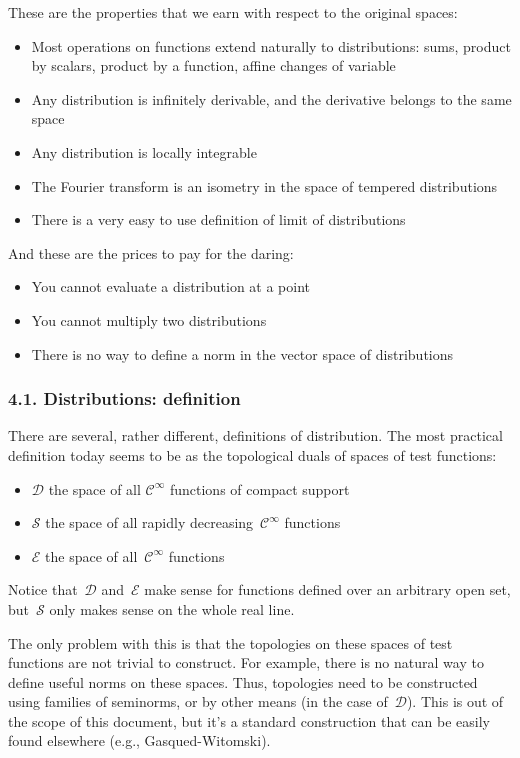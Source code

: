 These are the properties that we earn with respect to the original
spaces:
\begin{itemize}
	\item Most operations on functions extend naturally to
		distributions: sums, product by scalars, product by a function,
		affine changes of variable
	\item Any distribution is infinitely derivable, and the derivative
		belongs to the same space
	\item Any distribution is locally integrable
	\item The Fourier transform is an isometry in the space of
		tempered distributions
	\item There is a very easy to use definition of limit of
		distributions
\end{itemize}

And these are the prices to pay for the daring:
\begin{itemize}
	\item You cannot evaluate a distribution at a point
	\item You cannot multiply two distributions
	\item There is no way to define a norm in the vector space of
		distributions
\end{itemize}

\subsubsection{4.1. Distributions: definition}

There are several, rather different, definitions of distribution.
The most practical definition today seems to be as the topological
duals of spaces of test functions:

\begin{itemize}
	\item $\mathcal{D}$ the space of all $\mathcal{C}^\infty$
		functions of compact support
	\item $\mathcal{S}$ the space of all rapidly
		decreasing~$\mathcal{C}^\infty$ functions
	\item $\mathcal{E}$ the space of all~$\mathcal{C}^\infty$
		functions
\end{itemize}

Notice that~$\mathcal{D}$ and~$\mathcal{E}$ make sense for functions
defined over an arbitrary open set, but~$\mathcal{S}$ only makes
sense on the whole real line.

The only problem with this is that the topologies on these spaces of
test functions are not trivial to construct.  For example, there is
no natural way to define useful norms on these spaces.  Thus,
topologies need to be constructed using families of seminorms, or by
other means (in the case of~$\mathcal{D}$).  This is out of the scope
of this document, but it's a standard construction that can be easily
found elsewhere (e.g., Gasqued-Witomski).

